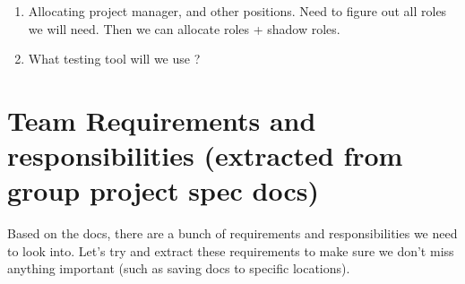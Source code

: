 \documentclass[a4paper]{article}
\begin{document}
\begin{flushleft}
\begin{enumerate}
    \item Allocating project manager, and other positions. 
    \linebreak
    Need to figure out all roles we will need. Then we can allocate roles + shadow roles.
    
    \item What testing tool will we use ? 
\end{enumerate}


\section{Team Requirements and responsibilities (extracted from group project spec docs)}
Based on the docs, there are a bunch of requirements and responsibilities we need to look into.
\linebreak
Let's try and extract these requirements to make sure we don't miss anything important (such as saving docs to specific locations).

\end{flushleft}
\end{document}
